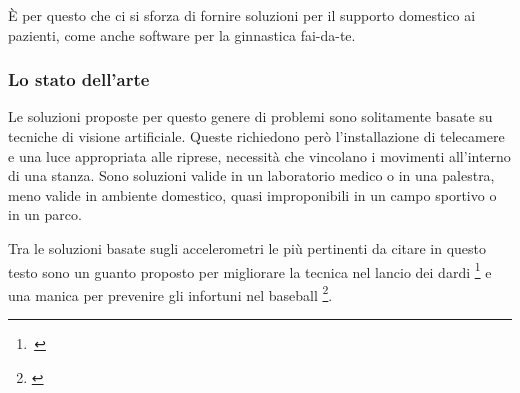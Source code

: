 È per questo che ci si sforza di fornire soluzioni per il supporto domestico ai pazienti,
come anche software per la ginnastica fai-da-te.




	\subsubsection{Lo stato dell'arte}
Le soluzioni proposte per questo genere di problemi
sono solitamente basate su tecniche di visione artificiale.
Queste richiedono però l'installazione di telecamere
e una luce appropriata alle riprese,
necessità che vincolano i movimenti all'interno di una stanza.
Sono soluzioni valide in un laboratorio medico o in una palestra,
meno valide in ambiente domestico,
quasi improponibili in un campo sportivo o in un parco.



Tra le soluzioni basate sugli accelerometri
le più pertinenti da citare in questo testo
sono un guanto proposto per migliorare la tecnica
nel lancio dei dardi \footnote{\,\cite{cit:guanto}}
e una manica per prevenire gli infortuni nel baseball \footnote{\cite{cit:manica}}.





